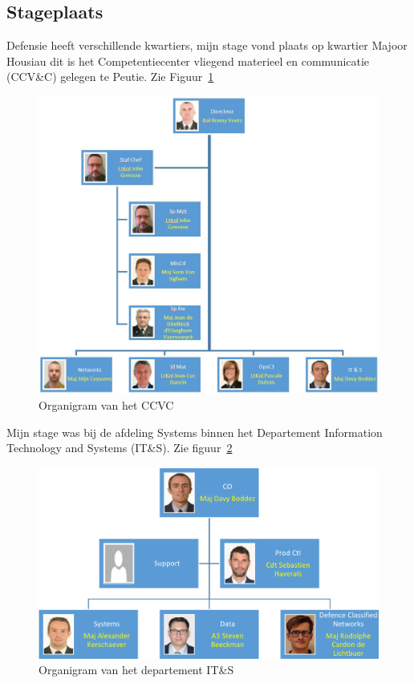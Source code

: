 \subsection{Stageplaats}

Defensie heeft verschillende \glspl{kwartier}, mijn stage vond plaats op \gls{kwartier} Majoor Housiau dit is het Competentiecenter vliegend materieel en communicatie (CCV\&C) gelegen te Peutie. Zie Figuur~\ref{fig:organigram-ccvc}

\begin{figure}
    \includegraphics[width=\textwidth]{img/organigram-ccvc.png}
    \caption{\label{fig:organigram-ccvc}Organigram van het CCVC}
\end{figure}

Mijn stage was bij de afdeling Systems binnen het Departement Information Technology and Systems (IT\&S). Zie figuur~\ref{fig:organigram-its}

\begin{figure}
    \includegraphics[width=\textwidth]{img/organigram-its.png}
    \caption{\label{fig:organigram-its}Organigram van het departement IT\&S}
\end{figure}

